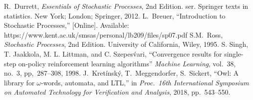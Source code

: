 \documentclass[10pt]{article}
\begin{document}
\begin{thebibliography}{99}
R.\ Durrett,
\textit{Essentials of Stochastic Processes}, 2nd Edition. ser. Springer texts in statistics. New York; London; Springer, 2012.
L.\ Breuer,
``Introduction to Stochastic Processes,'' [Online]. Available: https://www.kent.ac.uk/smsas/personal/lb209/files/sp07.pdf
S.M.\ Ross,
\textit{Stochastic Processes}, 2nd Edition. University of California, Wiley, 1995.
S. Singh, T. Jaakkola, M. L. Littman, and C. Szepes\'{v}ari,
``Convergence results for single-step on-policy reinforcement learning algorithms'' \textit{Machine Learning},
vol.~38, no.~3, pp,~287--308, 1998.
J.~Kretínsk\'{y}, T.~Meggendorfer, S.~Sickert, ``Owl: A library for $\omega$-words, automata,
and LTL,'' in \textit{Proc.~16th International Symposium on Automated Technology for Verification and Analysis}, 2018,  pp.~543–550.

\end{thebibliography}
\end{document}
